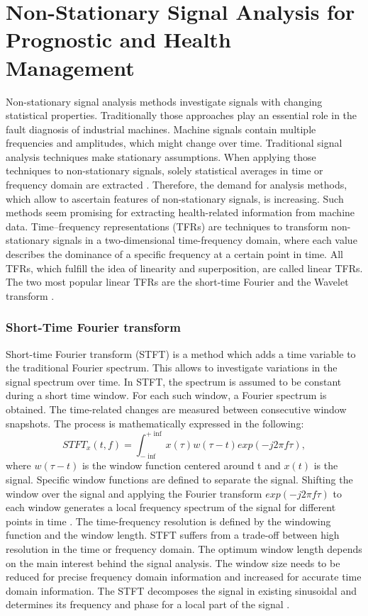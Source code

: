\section{Non-Stationary Signal Analysis for Prognostic and Health Management}
Non-stationary signal analysis methods investigate signals with changing statistical properties. Traditionally those approaches play an essential role in the fault diagnosis of industrial machines. Machine signals contain multiple frequencies and amplitudes, which might change over time. Traditional signal analysis techniques make stationary assumptions. When applying those techniques to non-stationary signals, solely statistical averages in time or frequency domain are extracted \cite{FENG2013}. Therefore, the demand for analysis methods, which allow to ascertain features of non-stationary signals, is increasing. Such methods seem promising for extracting health-related information from machine data. Time–frequency representations (TFRs) are techniques to transform non-stationary signals in a two-dimensional time-frequency domain, where each value describes the dominance of a specific frequency at a certain point in time. All TFRs, which fulfill the idea of linearity and superposition, are called linear TFRs. The two most popular linear TFRs are the short-time Fourier and the Wavelet transform \cite{Hlawatsch1992}. 


\subsubsection{Short-Time Fourier transform}
Short-time Fourier transform (STFT) is a method which adds a time variable to the traditional Fourier spectrum. This allows to investigate variations in the signal spectrum over time. In STFT, the spectrum is assumed to be constant during a short time window. For each such window, a Fourier spectrum is obtained. The time-related changes are measured between consecutive window snapshots. The process is mathematically expressed in the following:  
\begin{equation}
    STFT_{x}(t,f) = \int_{- \inf}^{+ \inf}x(\tau) w(\tau -t) exp(-j2\pi f \tau),
\end{equation}
where  $w(\tau -t)$ is the window function centered around t and $x(t)$ is the signal. Specific window functions are defined to separate the signal. Shifting the window over the signal and applying the Fourier transform $exp(-j2\pi f \tau)$ to each window generates a local frequency spectrum of the signal for different points in time \cite{FENG2013}. The time-frequency resolution is defined by the windowing function and the window length. STFT suffers from a trade-off between high resolution in the time or frequency domain. The optimum window length depends on the main interest behind the signal analysis. The window size needs to be reduced for precise frequency domain information and increased for accurate time domain information. The STFT decomposes the signal in existing sinusoidal and determines its frequency and phase for a local part of the signal \cite{Hlawatsch1992}. 

